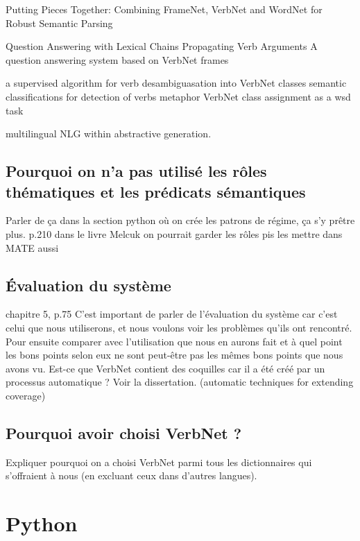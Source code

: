 Putting Pieces Together: Combining FrameNet, VerbNet and WordNet for Robust Semantic Parsing

Question Answering with Lexical Chains Propagating Verb Arguments
A question answering system based on VerbNet frames

a supervised algorithm for verb desambiguasation into VerbNet classes
semantic classifications for detection of verbs metaphor
VerbNet class assignment as a wsd task

multilingual NLG within abstractive generation.

\subsection{Pourquoi on n'a pas utilisé les rôles thématiques et les prédicats sémantiques}

Parler de ça dans la section python où on crée les patrons de régime, ça s'y prêtre plus.
p.210 dans le livre Melcuk
on pourrait garder les rôles pis les mettre dans MATE aussi

\subsection{Évaluation du système}
chapitre 5, p.75 C'est important de parler de l'évaluation du système car c'est celui que nous utiliserons, et nous voulons voir les problèmes qu'ils ont rencontré. Pour ensuite comparer avec l'utilisation que nous en aurons fait et à quel point les bons points selon eux ne sont peut-être pas les mêmes bons points que nous avons vu. Est-ce que VerbNet contient des coquilles car il a été créé par un processus automatique ? Voir la dissertation. (automatic techniques for extending coverage)

\subsection{Pourquoi avoir choisi VerbNet ?}

Expliquer pourquoi on a choisi VerbNet parmi tous les dictionnaires qui s'offraient à nous (en excluant ceux dans d'autres langues).




\section{Python}

